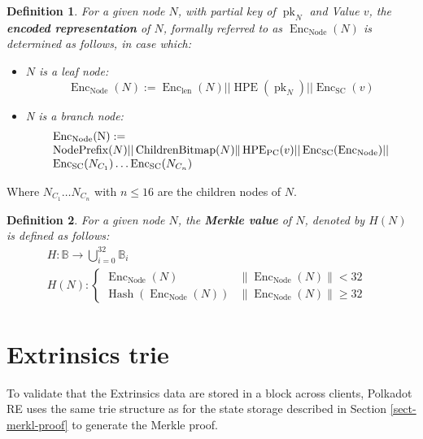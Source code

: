 \documentclass{article}
\newcommand{\assign}{:=}
\newcommand{\nobracket}{}
\newcommand{\nosymbol}{}
\newcommand{\tmop}[1]{\ensuremath{\operatorname{#1}}}
\newcommand{\tmrsub}[1]{\ensuremath{_{\textrm{#1}}}}
\newcommand{\tmstrong}[1]{\textbf{#1}}
\newcommand{\tmtextbf}[1]{{\bfseries{#1}}}
\newtheorem{definition}{Definition}
\providecommand{\nobracket}{}
\providecommand{\nosymbol}{}
\providecommand{\tmop}[1]{\ensuremath{\mathrm{#1}}}
\providecommand{\tmrsub}[1]{\tmrsub{\ensuremath{\mathrm{#1}}}}
\providecommand{\tmstrong}[1]{\tmtextbf{#1}}
\providecommand{\tmtextbf}[1]{\tmtextbf{#1}}
\newtheorem{definition}{Definition}
\begin{document}
\begin{definition}
  For a given node $N$, with partial key of $\tmop{pk}_N$ and Value $v$, the
  {\tmstrong{encoded representation}} of $N$, formally referred to as
  $\tmop{Enc}_{\tmop{Node}} (N)$ is determined as follows, in case which:
  \begin{itemize}
    \item $N$ is a leaf node:
    \[ \tmop{Enc}_{\tmop{Node}} (N) \assign \tmop{Enc}_{\tmop{len}} (N) ||
       \tmop{HPE} (\tmop{pk}_N) || \tmop{Enc}_{\tmop{SC}} (v) \]
    \item N is a branch node:
    \[ \begin{array}{l}
         \text{Enc\tmrsub{Node}(N)} \assign\\
         \nobracket \tmop{NodePrefix} (N) || \tmop{ChildrenBitmap} (N) \|
         \tmop{HPE}_{\tmop{PC}} (v) || \tmop{Enc}_{\tmop{SC}}
         (\tmop{Enc}_{\tmop{Node}}) ||\\
         \tmop{Enc}_{\tmop{SC}} (N_{C_1}) \ldots \tmop{Enc}_{\tmop{SC}}
         (N_{C_n})
       \end{array} \]
  \end{itemize}
\end{definition}

Where $N_{C_1} \ldots N_{C_n}$ with $n \leqslant 16$ are the children nodes of
$N$.

\begin{definition}
  For a given node $N$, the {\tmstrong{Merkle value}} of $N$, denoted by $H
  (N)$ is defined as follows:
  \[ \begin{array}{lll}
       & H : \mathbb{B} \rightarrow \bigcup_{i = 0^{\nosymbol}}^{32}
       \mathbb{B}_i & \\
       & H (N) : \left\{ \begin{array}{lll}
         \tmop{Enc}_{\tmop{Node}} (N) & \| \tmop{Enc}_{\tmop{Node}} (N)\|< 32
         & \\
         \tmop{Hash} (\tmop{Enc}_{\tmop{Node}} (N)) & \|
         \tmop{Enc}_{\tmop{Node}} (N)\| \geqslant 32 & 
       \end{array} \right. & 
     \end{array} \]
\end{definition}

\section{Extrinsics trie}

To validate that the Extrinsics data are stored in a block across clients,
Polkadot RE uses the same trie structure as for the state storage described in
Section \ref{sect-merkl-proof} to generate the Merkle proof.
\end{document}
